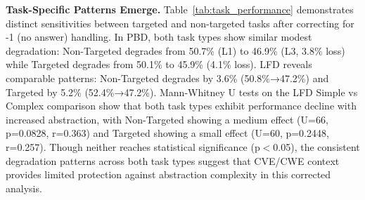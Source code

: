 \documentclass[lettersize,journal]{IEEEtran}
\newif\ifshowcomments
\newcommand{\rn}[1]{\ifshowcomments\textcolor{blue}{#1}\fi}
\begin{document}
\textbf{Task-Specific Patterns Emerge.} Table~\ref{tab:task_performance} demonstrates distinct sensitivities between targeted and non-targeted tasks after correcting for -1 (no answer) handling. In PBD, both task types show similar modest degradation: Non-Targeted degrades from 50.7\% (L1) to 46.9\% (L3, 3.8\% loss) while Targeted degrades from 50.1\% to 45.9\% (4.1\% loss). LFD reveals comparable patterns: Non-Targeted degrades by 3.6\% (50.8\%→47.2\%) and Targeted by 5.2\% (52.4\%→47.2\%). Mann-Whitney U tests on the LFD Simple vs Complex comparison show that both task types exhibit performance decline with increased abstraction, with Non-Targeted showing a medium effect (U=66, p=0.0828, r=0.363) and Targeted showing a small effect (U=60, p=0.2448, r=0.257). Though neither reaches statistical significance (p$<$0.05), the consistent degradation patterns across both task types suggest that CVE/CWE context provides limited protection against abstraction complexity in this corrected analysis.
\end{document}
